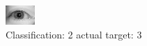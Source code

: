 \begin{figure}[h!]
\begin{center}
\includegraphics[width=0.60\columnwidth]{figures/ID3102_class_2_target_3.png}
\end{center}
\caption{ Classification: 2 actual target: 3}
\label{fig:ID3102_class_2_target_3}
\end{figure}
